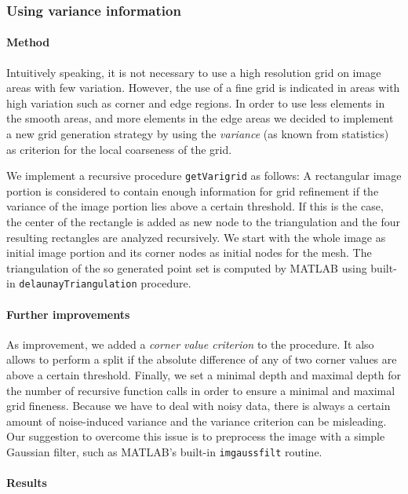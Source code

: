 \documentclass{report}
\begin{document}
\subsubsection{Using variance information}

\paragraph{Method}

Intuitively speaking, it is not necessary to use a high resolution grid on image areas with few variation. However, the use of a fine grid is indicated in areas with high variation such as corner and edge regions. In order to use less elements in the smooth areas, and more elements in the edge areas we decided to implement a new grid generation strategy by using the \emph{variance} (as known from statistics) as criterion for the local coarseness of the grid.

We implement a recursive procedure \texttt{getVarigrid} as follows: A rectangular image portion is considered to contain enough information for grid refinement if the variance of the image portion lies above a certain threshold. If this is the case, the center of the rectangle is added as new node to the triangulation and the four resulting rectangles are analyzed recursively. We start with the whole image as initial image portion and its corner nodes as initial nodes for the mesh. The triangulation of the so generated point set is computed by MATLAB using built-in \texttt{delaunayTriangulation} procedure.

\paragraph{Further improvements}

As improvement, we added a \emph{corner value criterion} to the procedure. It also allows to perform a split if the absolute difference of any of two corner values are above a certain threshold. Finally, we set a minimal depth and maximal depth for the number of recursive function calls in order to ensure a minimal and maximal grid fineness. Because we have to deal with noisy data, there is always a certain amount of noise-induced variance and the variance criterion can be misleading. Our suggestion to overcome this issue is to preprocess the image with a simple Gaussian filter, such as MATLAB's built-in \texttt{imgaussfilt} routine.

\paragraph{Results}
\end{document}

